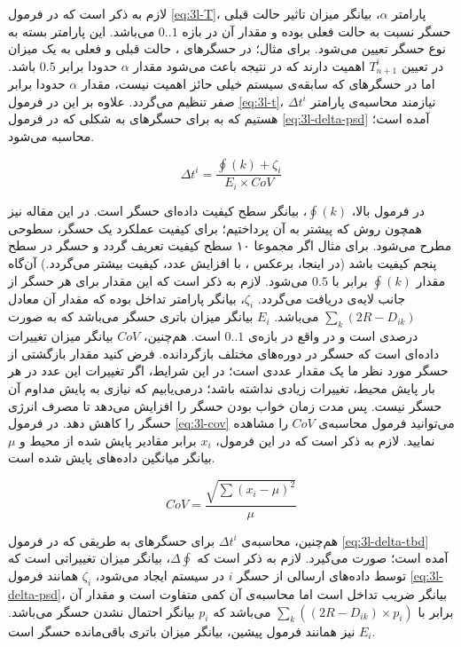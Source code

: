 \par
لازم به ذکر است که در فرمول \ref{eq:3l-T}، پارامتر $\alpha$، بیانگر میزان تاثیر حالت قبلی حسگر نسبت به حالت فعلی بوده و مقدار آن در بازه $0..1$ می‌باشد. این پارامتر بسته به نوع حسگر تعیین می‌شود. برای مثال؛ در حسگرهای ، حالت قبلی و فعلی به یک میزان در تعیین $T_{n+1}^i$ اهمیت دارند که در نتیجه باعث می‌شود مقدار $\alpha$ حدودا برابر $0.5$ باشد. اما در حسگرهای  که سابقه‌ی سیستم خیلی حائز اهمیت نیست، مقدار 
$\alpha$ 
حدودا برابر صفر تنظیم می‌گردد. علاوه بر این در فرمول \ref{eq:3l-t}، نیازمند محاسبه‌ی پارامتر $\Delta t^i$ هستیم که به برای حسگرهای  به شکلی که در فرمول \ref{eq:3l-delta-psd} آمده است؛ محاسبه می‌شود.

\begin{equation}
\Delta t^i = \frac{\oint(k) + \zeta_i}{E_i \times CoV}
\label{eq:3l-delta-psd}
\end{equation}

\par
در فرمول بالا، $\oint(k)$، بیانگر سطح کیفیت داده‌ای حسگر است. در این مقاله نیز همچون روش  که پیشتر به آن پرداختیم؛ برای کیفیت عملکرد یک حسگر، سطوحی مطرح می‌شود. برای مثال اگر مجموعا ۱۰ سطح کیفیت تعریف گردد و حسگر در سطح پنجم کیفیت باشد (در اینجا، برعکس ، با افزایش عدد، کیفیت بیشتر می‌گردد.) آن‌گاه مقدار $\oint(k)$ برابر با $0.5$ می‌شود. لازم به ذکر است که این مقدار برای هر حسگر از جانب لایه‌ی  دریافت می‌گردد. $\zeta_i$، بیانگر پارامتر تداخل بوده که مقدار آن معادل 
$\sum_k (2R - D_{ik})$ 
می‌باشد. $E_i$ بیانگر میزان باتری حسگر می‌باشد که به صورت درصدی است و در واقع در بازه‌ی $0..1$ است. هم‌چنین، $CoV$ بیانگر میزان تغییرات داده‌ای است که حسگر در دوره‌های مختلف بازگردانده. فرض کنید مقدار بازگشتی از حسگر مورد نظر ما یک مقدار عددی است؛ در این شرایط، اگر تغییرات این عدد در هر بار پایش محیط، تغییرات زیادی نداشته باشد؛ درمی‌یابیم که نیازی به پایش مداوم آن حسگر نیست. پس  مدت زمان خواب بودن حسگر را افزایش می‌دهد تا مصرف انرژی حسگر را کاهش دهد. در فرمول \ref{eq:3l-cov} می‌توانید فرمول محاسبه‌ی $CoV$ را مشاهده نمایید. لازم به ذکر است که در این فرمول، $x_i$ برابر مقادیر پایش شده از محیط و $\mu$ بیانگر میانگین داده‌های پایش شده است.

\begin{equation}
CoV = \frac{\sqrt{\sum(x_i - \mu)^2}}{\mu}
\label{eq:3l-cov}
\end{equation}

\par
هم‌چنین، محاسبه‌ی $\Delta t^i$ برای حسگرهای  به طریقی که در فرمول \ref{eq:3l-delta-tbd} آمده است؛ صورت می‌گیرد. لازم به ذکر است که
$\Delta\oint$،
بیانگر میزان تغییراتی است که توسط داده‌های ارسالی از حسگر $i$ در سیستم ایجاد می‌شود، $\zeta_i$ همانند فرمول \ref{eq:3l-delta-psd}، بیانگر ضریب تداخل است اما محاسبه‌ی آن کمی متفاوت است و مقدار آن برابر با $\sum_k ((2R - D_{ik}) \times p_i)$ می‌باشد که $p_i$ بیانگر احتمال  نشدن حسگر می‌باشد. $E_i$ نیز همانند فرمول پیشین، بیانگر میزان باتری باقی‌مانده حسگر است.

